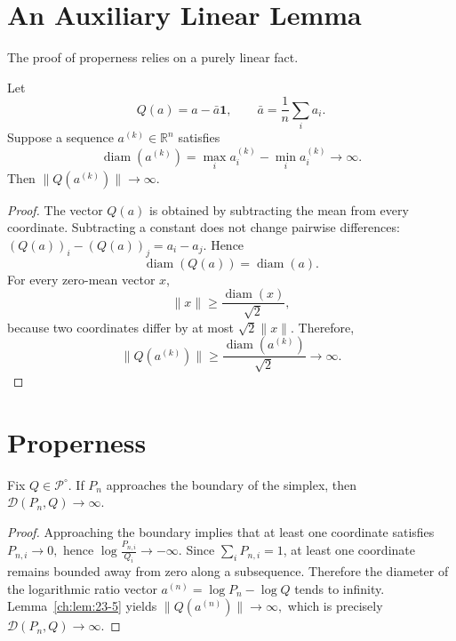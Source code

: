 \section{An Auxiliary Linear Lemma}
The proof of properness relies on a purely linear fact.
\begin{lemma}
\label{ch:lem:23-5}
Let
\[ Q(a)=a-\bar a\mathbf 1, \qquad
\bar a=\frac1n\sum_i a_i. \]
Suppose a sequence \(a^{(k)}\in\mathbb R^n\) satisfies
\[ \operatorname{diam}(a^{(k)}) = \max_i
a_i^{(k)}-\min_i a_i^{(k)}
\longrightarrow\infty. \]
Then
$\|Q(a^{(k)})\|\longrightarrow\infty.$
\end{lemma}
\begin{proof} The vector \(Q(a)\) is obtained by subtracting the mean from
every coordinate. Subtracting a constant does not change pairwise
differences:
$(Q(a))_i-(Q(a))_j=a_i-a_j.$
Hence
\[ \operatorname{diam}(Q(a)) = \operatorname{diam}(a). \]
For every zero-mean vector \(x\),
\[ \|x\| \ge \frac{\operatorname{diam}(x)}{\sqrt 2}, \]
because two coordinates differ by at most \(\sqrt 2\|x\|\).
Therefore,
\[ \|Q(a^{(k)})\| \ge
\frac{\operatorname{diam}(a^{(k)})}{\sqrt 2}
\longrightarrow\infty. \]
\end{proof}
\section{Properness}
\begin{theorem}[Properness]
\label{ch:thm:23-6}
Fix \(Q\in\mathcal P^\circ\). If \(P_n\) approaches
the boundary of the simplex, then
$\mathcal D(P_n,Q)\to\infty.$
\end{theorem}
\begin{proof} Approaching the boundary implies that at least one coordinate
satisfies
$P_{n,i}\to0,$
hence
$\log\frac{P_{n,i}}{Q_i}\to-\infty.$
Since \(\sum_i P_{n,i}=1\), at least one coordinate remains bounded
away from zero along a subsequence. Therefore the diameter of the
logarithmic ratio vector
$a^{(n)}=\log P_n-\log Q$
tends to infinity. Lemma~\ref{ch:lem:23-5} yields
$\|Q(a^{(n)})\|\to\infty,$ which is precisely \(\mathcal D(P_n,Q)\to\infty\). 
\end{proof}
